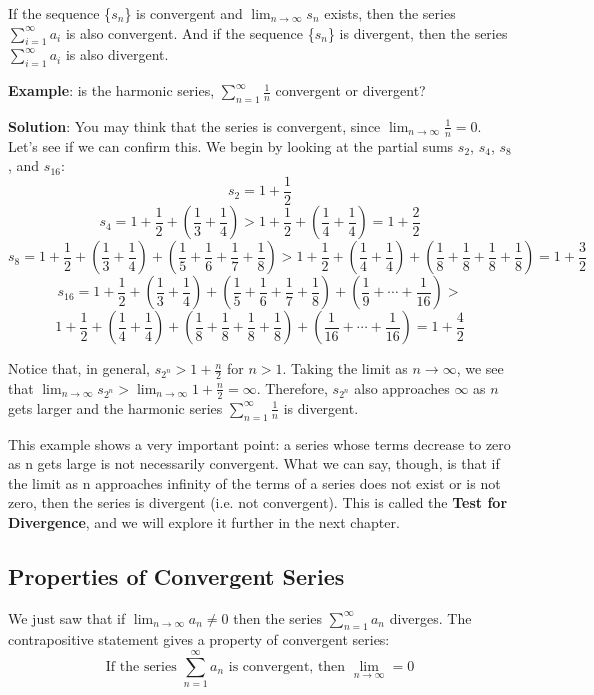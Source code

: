 If the sequence \{$s_n$\} is convergent and $\lim_{n \to \infty} s_n$ 
exists, then the series $\sum_{i=1}^\infty a_i$ is also convergent. 
And if the sequence \{$s_n$\} is divergent, then the series 
$\sum_{i=1}^\infty a_i$ is also divergent.

\textbf{Example}: is the harmonic series, $\sum_{n = 1}^\infty \frac{1}{n}$ 
convergent or divergent?

\textbf{Solution}: You may think that the series is convergent, since $\lim_
{n \to \infty} \frac{1}{n} = 0$. Let's see if we can confirm this. We begin by 
looking at the partial sums $s_2$, $s_4$, $s_8$, and $s_{16}$:
$$s_2 = 1 + \frac{1}{2}$$
$$s_4 = 1 + \frac{1}{2} + \left(\frac{1}{3} + \frac{1}{4} \right) > 1 + 
\frac{1}{2} + \left( \frac{1}{4} + \frac{1}{4} \right) = 1 + \frac{2}{2}$$
$$s_8 = 1 + \frac{1}{2} + \left(\frac{1}{3} + \frac{1}{4} \right) + \left( 
\frac{1}{5} + \frac{1}{6} + \frac{1}{7} + \frac{1}{8} \right) > 1 + \frac{1}{2} 
+ \left(\frac{1}{4} + \frac{1}{4} \right) + \left( \frac{1}{8} + \frac{1}{8} + 
\frac{1}{8} + \frac{1}{8} \right) = 1 + \frac{3}{2}$$
$$s_{16} = 1 + \frac{1}{2} + \left(\frac{1}{3} + \frac{1}{4} \right) + \left( 
\frac{1}{5} + \frac{1}{6} + \frac{1}{7} + \frac{1}{8} \right) + \left(
\frac{1}{9} + \cdots + \frac{1}{16} \right) > $$
$$1 + \frac{1}{2} + \left(\frac{1}{4} + \frac{1}{4} \right) + \left( 
\frac{1}{8} + \frac{1}{8} + \frac{1}{8} + \frac{1}{8} \right) + \left(
\frac{1}{16} + \cdots + \frac{1}{16} \right) = 1 + \frac{4}{2}$$

Notice that, in general, $s_{2^n} > 1 + \frac{n}{2}$ for $n > 1$. Taking the 
limit as $n \to \infty$, we see that $\lim_{n \to \infty} s_{2^n} > \lim_{n 
\to \infty} 1 + \frac{n}{2} = \infty$. Therefore, $s_{2^n}$ also approaches 
$\infty$ as $n$ gets larger and the harmonic series $\sum_{n = 1}^\infty 
\frac{1}{n}$ is divergent. 

This example shows a very important point: a series whose terms decrease to 
zero as n gets large is not necessarily convergent. What we can say, though, 
is that if the limit as n approaches infinity of the terms of a series does not 
exist or is not zero, then the series is divergent (i.e. not convergent). This 
is called the \textbf{Test for Divergence}, and we will explore it further in 
the next chapter. 

\subsection{Properties of Convergent Series}
We just saw that if $\lim_{n \to \infty} a_n \neq 0$ then the series $\sum_
{n=1}^\infty a_n$ diverges. The contrapositive statement gives a property of 
convergent series:
$$\text{If the series } \sum_{n=1}^\infty a_n \text{ is convergent, then } 
\lim_{n \to \infty} = 0$$

